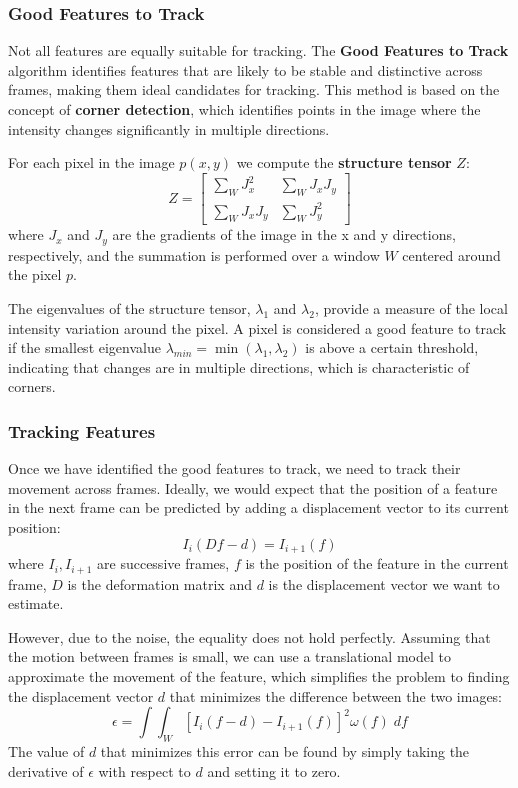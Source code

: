 \subsubsection{Good Features to Track}
Not all features are equally suitable for tracking. 
The \textbf{Good Features to Track} algorithm identifies features that are likely to be stable and distinctive across frames, making them ideal candidates for tracking.
This method is based on the concept of \textbf{corner detection}, which identifies points in the image where the intensity changes significantly in multiple directions.

For each pixel in the image $p(x, y)$ we compute the \textbf{structure tensor} $Z$:
\[ Z = \begin{bmatrix}
    \sum_{W} J_x^2 & \sum_{W} J_x J_y \\
    \sum_{W} J_x J_y & \sum_{W} J_y^2
\end{bmatrix} \]
where $J_x$ and $J_y$ are the gradients of the image in the x and y directions, respectively, 
and the summation is performed over a window $W$ centered around the pixel $p$.

The eigenvalues of the structure tensor, $\lambda_1$ and $\lambda_2$, provide a measure of the local intensity variation around the pixel.
A pixel is considered a good feature to track if the smallest eigenvalue $\lambda_{min} = \min(\lambda_1, \lambda_2)$ is above a certain threshold, 
indicating that changes are in multiple directions, which is characteristic of corners.

\subsubsection{Tracking Features}
Once we have identified the good features to track, we need to track their movement across frames.
Ideally, we would expect that the position of a feature in the next frame can be predicted by adding a displacement vector to its current position:
\[ I_i(Df - d) = I_{i+1}(f) \]
where $I_i, I_{i+1}$ are successive frames, $f$ is the position of the feature in the current frame, $D$ is the deformation matrix 
and $d$ is the displacement vector we want to estimate.

However, due to the noise, the equality does not hold perfectly. Assuming that the motion between frames is small, 
we can use a translational model to approximate the movement of the feature, which simplifies the problem to 
finding the displacement vector $d$ that minimizes the difference between the two images:
\[ \epsilon = \int \int_{W} [I_i(f - d) -  I_{i+1}(f)]^2 \omega(f) \; df \]
The value of $d$ that minimizes this error can be found by simply taking the derivative of $\epsilon$ with respect to $d$ and setting it to zero.

